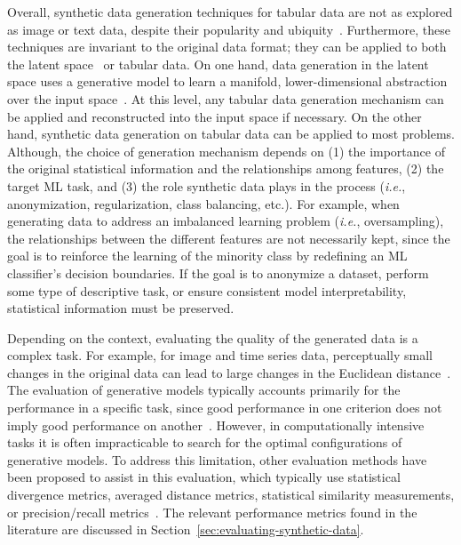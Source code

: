 Overall, synthetic data generation techniques for tabular data are not as
explored as image or text data, despite their popularity and
ubiquity~\cite{fakoor2020fast}. Furthermore, these techniques are invariant to
the original data format; they can be applied to both the latent
space~\cite{devries2017dataset} or tabular data. On one hand, data generation
in the latent space uses a generative model to learn a manifold,
lower-dimensional abstraction over the input
space~\cite{kingma2019introduction}. At
this level, any tabular data generation mechanism can be applied and
reconstructed into the input space if necessary. On the other hand, synthetic
data generation on tabular data can be applied to most problems. Although, the
choice of generation mechanism depends on (1) the importance of the original
statistical information and the relationships among features, (2) the target
ML task, and (3) the role synthetic data plays in the process (\textit{i.e.},
anonymization, regularization, class balancing, etc.).  For example, when
generating data to address an imbalanced learning problem (\textit{i.e.},
oversampling), the relationships between the different features are not
necessarily kept, since the goal is to reinforce the learning of the minority
class by redefining an ML classifier's decision boundaries. If the goal is to
anonymize a dataset, perform some type of descriptive task, or ensure
consistent model interpretability, statistical information must be preserved.

Depending on the context, evaluating the quality of the generated data is a
complex task. For example, for image and time series data, perceptually small
changes in the original data can lead to large changes in the Euclidean
distance~\cite{assefa2020generating, theis2016note}. The evaluation of
generative models typically accounts primarily for the performance in a
specific task, since good performance in one criterion does not imply good
performance on another~\cite{theis2016note}. However, in computationally
intensive tasks it is often impracticable to search for the optimal
configurations of generative models. To address this limitation, other
evaluation methods have been proposed to assist in this evaluation, which
typically use statistical divergence metrics, averaged distance metrics,
statistical similarity measurements, or precision/recall
metrics~\cite{chundawat2022tabsyndex, alaa2022faithful}. The relevant
performance metrics found in the literature are discussed in
Section~\ref{sec:evaluating-synthetic-data}.

